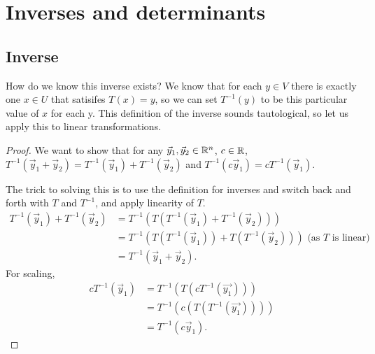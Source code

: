 \section{Inverses and determinants}
\subsection{Inverse}
How do we know this inverse exists? We know that for each $y\in V$ there is exactly one
$x\in U$ that satisifes $T(x)=y$, so we can set $T^{-1}(y)$ to be this particular value of $x$ for each y.
This definition of the inverse sounds tautological, so let us apply this to linear transformations.
\begin{proof}
    We want to show that for any $\vec{y}_1,\vec{y}_2\in\mathbb{R}^n$, $c\in \mathbb{R}$,
    $T^{-1}(\vec{y}_1+\vec{y}_2)=T^{-1}(\vec{y}_1)+T^{-1}(\vec{y}_2)$ and $T^{-1}(c\vec{y}_1)=cT^{-1}(\vec{y}_1)$.

    The trick to solving this is to use the definition for inverses and switch back and forth with $T$ and $T^{-1}$, and apply linearity of $T$.
    \begin{align*}
        T^{-1}(\vec{y}_1)+T^{-1}(\vec{y}_2) &= T^{-1}(T(T^{-1}(\vec{y}_1)+T^{-1}(\vec{y}_2)))\\
        &=T^{-1}(T(T^{-1}(\vec{y}_1))+T(T^{-1}(\vec{y}_2))) \textrm{ (as $T$ is linear)}\\
        &=T^{-1}(\vec{y}_1+\vec{y}_2).
    \end{align*}
    For scaling,\begin{align*}
        cT^{-1}(\vec{y}_1) &= T^{-1}(T(cT^{-1}(\vec{y_1})))\\
        &=T^{-1}(c(T(T^{-1}(\vec{y_1}))))\\
        &=T^{-1}(c\vec{y}_1).
    \end{align*}
\end{proof}
